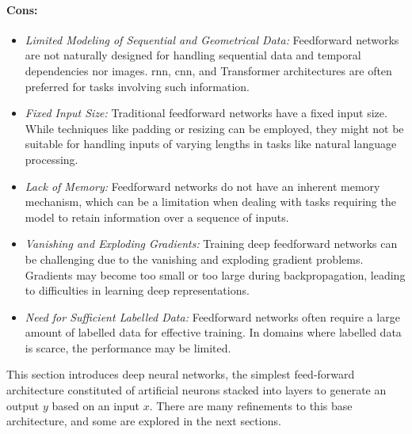 \paragraph{Cons:}
\begin{itemize}
    \item \textit{Limited Modeling of Sequential and Geometrical Data:} Feedforward networks are not naturally designed for handling sequential data and temporal dependencies nor images. \gls{rnn}, \gls{cnn}, and Transformer architectures are often preferred for tasks involving such information.
    \item \textit{Fixed Input Size:} Traditional feedforward networks have a fixed input size. While techniques like padding or resizing can be employed, they might not be suitable for handling inputs of varying lengths in tasks like natural language processing.
    \item \textit{Lack of Memory:} Feedforward networks do not have an inherent memory mechanism, which can be a limitation when dealing with tasks requiring the model to retain information over a sequence of inputs.
    \item \textit{Vanishing and Exploding Gradients:} Training deep feedforward networks can be challenging due to the vanishing and exploding gradient problems. Gradients may become too small or too large during backpropagation, leading to difficulties in learning deep representations.
    \item \textit{Need for Sufficient Labelled Data:} Feedforward networks often require a large amount of labelled data for effective training. In domains where labelled data is scarce, the performance may be limited.
\end{itemize}

This section introduces deep neural networks, the simplest feed-forward architecture constituted of artificial neurons stacked into layers to generate an output $y$ based on an input $x$. There are many refinements to this base architecture, and some are explored in the next sections. 

